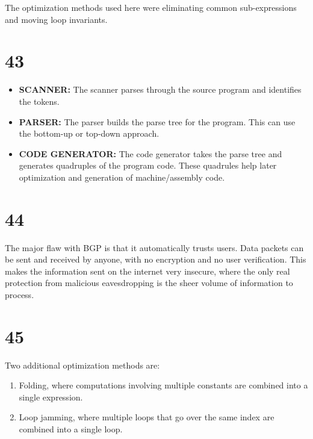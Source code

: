 \documentclass[a4paper,11pt]{article}
\begin{document}
The optimization methods used here were eliminating common sub-expressions and moving loop invariants.  


\section*{43}
\begin{itemize}
  \item {\bf SCANNER:}  The scanner parses through the source program and identifies the tokens. 
  \item {\bf PARSER:} The parser builds the parse tree for the program.  This can use the bottom-up or top-down approach.
  \item {\bf CODE GENERATOR:} The code generator takes the parse tree and generates quadruples of the program code.  These quadrules help later optimization and generation of machine/assembly code.
\end{itemize}



\section*{44}
The major flaw with BGP is that it automatically trusts users.  Data packets can be sent and received by anyone, with no encryption and no user verification.  This makes the information sent on the internet very insecure, where the only real protection from malicious eavesdropping is the sheer volume of information to process.



\section*{45}
Two additional optimization methods are:
\begin{enumerate}
  \item Folding, where computations involving multiple constants are combined into a single expression.
  \item Loop jamming, where multiple loops that go over the same index are combined into a single loop.
\end{enumerate}

\end{document}
